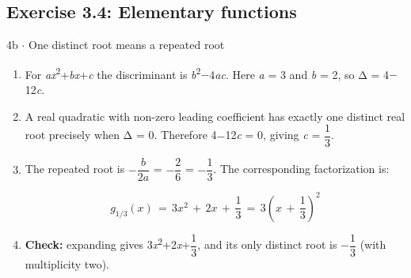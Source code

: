 \documentclass[11pt]{article}
\begin{document}
\begin{keepsection}\subsection{Exercise 3.4: Elementary functions}

\begin{workedbox}{4b \ensuremath{\cdot} One distinct root means a repeated root}
\begin{enumerate}
\item For \textit{a}\textit{x}\textsuperscript{2}+\textit{b}\textit{x}+\textit{c} the discriminant is \textit{b}\textsuperscript{2}\ensuremath{-}4\textit{a}\textit{c}. Here \textit{a} = 3 and \textit{b} = 2, so Δ = 4\ensuremath{-}12\textit{c}.
\item A real quadratic with non-zero leading coefficient has exactly one distinct real root precisely when Δ = 0. Therefore 4\ensuremath{-}12\textit{c} = 0, giving \textit{c} = {\small\ensuremath{\dfrac{1}{3}}}.
\item {}
The repeated root is \ensuremath{-}{\small\ensuremath{\dfrac{{b}}{2{a}}}} = \ensuremath{-}{\small\ensuremath{\dfrac{2}{6}}} = \ensuremath{-}{\small\ensuremath{\dfrac{1}{3}}}. The corresponding factorization is:

\begin{equation*}{g}_{1/3}({x})\, =\, 3{x}^{2}\, +\, 2{x}\, +\, \dfrac{1}{3}\, =\, 3\left({x}\, +\, \dfrac{1}{3}\right)^{2}\end{equation*}
\item \textbf{Check:} expanding gives 3\textit{x}\textsuperscript{2}+2\textit{x}+{\small\ensuremath{\dfrac{1}{3}}}, and its only distinct root is \ensuremath{-}{\small\ensuremath{\dfrac{1}{3}}} (with multiplicity two).
\end{enumerate}
\end{workedbox}

\end{keepsection}
\end{document}
